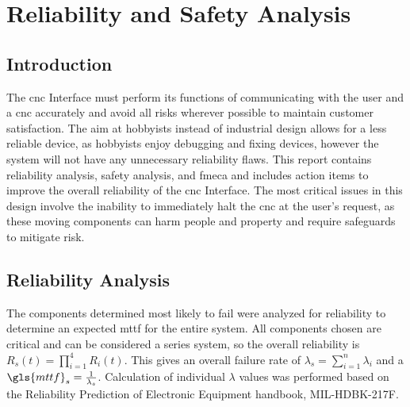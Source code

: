 \chapter{Reliability and Safety Analysis}

\section{Introduction}
The \gls{cnc} Interface must perform its functions of communicating with the user and a \gls{cnc} accurately and avoid all risks wherever possible to maintain customer satisfaction.
The aim at hobbyists instead of industrial design allows for a less reliable device, as hobbyists enjoy debugging and fixing devices, however the system will not have any unnecessary reliability flaws.
This report contains reliability analysis, safety analysis, and \gls{fmeca} and includes action items to improve the overall reliability of the \gls{cnc} Interface.
The most critical issues in this design involve the inability to immediately halt the \gls{cnc} at the user's request, as these moving components can harm people and property and require safeguards to mitigate risk. 

\section{Reliability Analysis}
The components determined most likely to fail were analyzed for reliability to determine an expected \gls{mttf} for the entire system.
All components chosen are critical and can be considered a series system, so the overall reliability is $R_s(t)=\prod_{i=1}^4R_i(t)$.
This gives an overall failure rate of $\lambda_s=\sum_{i=1}^n\lambda_i$ and a $\gls{mttf}_s=\frac{1}{\lambda_s}$.
Calculation of individual $\lambda$ values was performed based on the Reliability Prediction of Electronic Equipment handbook, MIL-HDBK-217F\cite{mil217f}.

